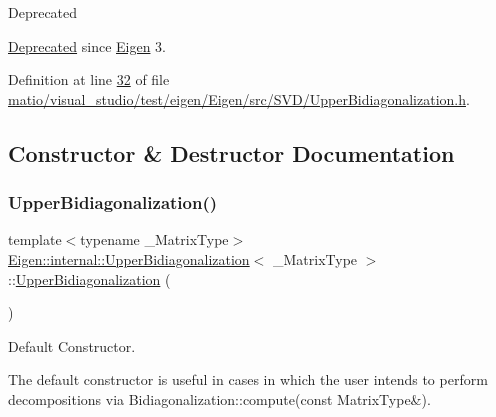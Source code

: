\begin{DoxyRefDesc}{Deprecated}
\item[\hyperlink{deprecated__deprecated000083}{Deprecated}]since \hyperlink{namespace_eigen}{Eigen} 3. \end{DoxyRefDesc}


Definition at line \hyperlink{matio_2visual__studio_2test_2eigen_2_eigen_2src_2_s_v_d_2_upper_bidiagonalization_8h_source_l00032}{32} of file \hyperlink{matio_2visual__studio_2test_2eigen_2_eigen_2src_2_s_v_d_2_upper_bidiagonalization_8h_source}{matio/visual\+\_\+studio/test/eigen/\+Eigen/src/\+S\+V\+D/\+Upper\+Bidiagonalization.\+h}.



\subsection{Constructor \& Destructor Documentation}
\mbox{\label{class_eigen_1_1internal_1_1_upper_bidiagonalization_aa37a7ca5f5e86e3efbc6907d03d89340}} 
\subsubsection{\texorpdfstring{Upper\+Bidiagonalization()}{UpperBidiagonalization()}\hspace{0.1cm}{\footnotesize\ttfamily [1/2]}}
{\footnotesize\ttfamily template$<$typename \+\_\+\+Matrix\+Type$>$ \\
\hyperlink{class_eigen_1_1internal_1_1_upper_bidiagonalization}{Eigen\+::internal\+::\+Upper\+Bidiagonalization}$<$ \+\_\+\+Matrix\+Type $>$\+::\hyperlink{class_eigen_1_1internal_1_1_upper_bidiagonalization}{Upper\+Bidiagonalization} (\begin{DoxyParamCaption}{ }\end{DoxyParamCaption})\hspace{0.3cm}{\ttfamily [inline]}}



Default Constructor. 

The default constructor is useful in cases in which the user intends to perform decompositions via Bidiagonalization\+::compute(const Matrix\+Type\&). 

